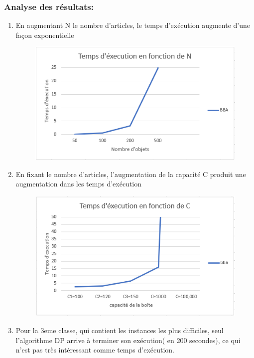 \documentclass[12pt]{article}
\begin{document}
\subsubsection{Analyse des résultats:}
\begin{enumerate}
    \item En augmentant N le nombre d’articles, le temps d'exécution augmente d’une façon exponentielle
    \begin{figure}[H]
        \includegraphics[width=13.5cm]{../figures/BBA_TEXEC_N.PNG}
    \end{figure}
    \item En fixant le nombre d’articles, l’augmentation de la capacité C produit une augmentation dans les temps d’exécution
    \begin{figure}[H]
        \includegraphics[width=13.5cm]{../figures/BBA_TEXEC_C.PNG}
    \end{figure}
    \item Pour la 3eme classe, qui contient les instances les plus difficiles, seul l’algorithme DP arrive à terminer son exécution( en 200 secondes), ce qui n’est pas très intéressant comme temps d'exécution.
\end{enumerate}
\end{document}
